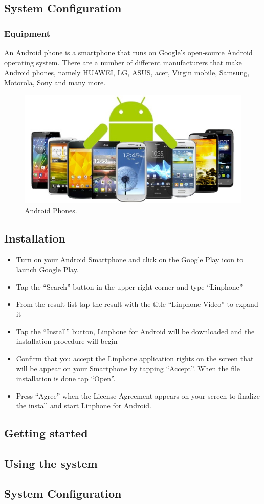 \documentclass[a4paper]{article}
\begin{document}
\subsection{System Configuration}

\subsubsection{Equipment}
An Android phone is a smartphone that runs on Google's open-source Android operating system. There are a number of different manufacturers that make Android phones, namely HUAWEI, LG, ASUS, acer, Virgin mobile, Samsung, Motorola, Sony and many more.

\begin{center}
\begin{figure}[h]
\centering
\includegraphics[width=0.7\linewidth]{./pictures/android.jpg}
\caption{\label{fig:Agile}Android Phones.}
\end{figure}
\end{center}

\newpage

\subsection{Installation}
\begin{itemize}
\item Turn on your Android Smartphone and click on the Google Play icon to launch Google Play.
\item Tap the “Search” button in the upper right corner and type “Linphone”
\item From the result list tap the result with the title “Linphone Video” to expand it
\item Tap the “Install” button, Linphone for Android will be downloaded and the installation procedure will begin
\item Confirm that you accept the Linphone application rights on the screen that will be appear on your Smartphone by tapping “Accept”. When the file installation is done tap “Open”.
\item Press “Agree” when the License Agreement appears on your screen to finalize the install and start Linphone for Android.
\end{itemize}

\newpage
\subsection{Getting started}

\newpage
\subsection{Using the system}

\newpage
\subsection{System Configuration}
\newpage
\end{document}
